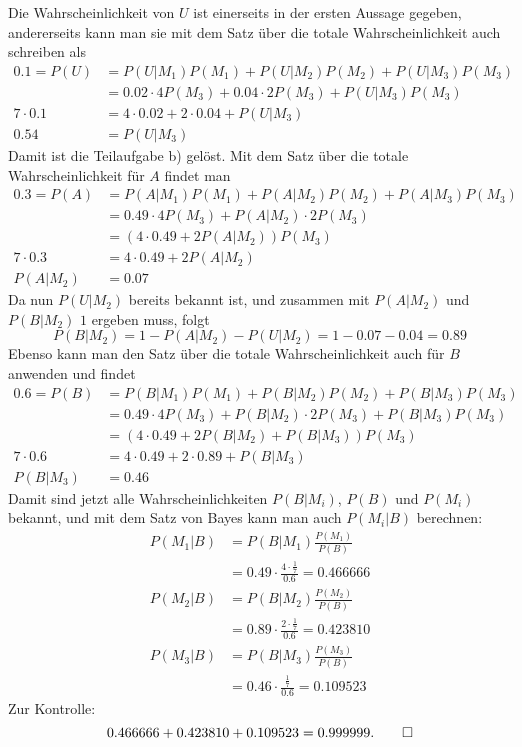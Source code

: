 \begin{loesung}
Die Wahrscheinlichkeit von $U$ ist einerseits in der ersten Aussage
gegeben, andererseits kann man sie mit dem Satz über die totale
Wahrscheinlichkeit auch schreiben als
\begin{align*}
0.1=P(U)
&=P(U|M_1)P(M_1)+P(U|M_2)P(M_2)+P(U|M_3)P(M_3)
\\
&=0.02\cdot 4P(M_3)+0.04\cdot 2P(M_3)+P(U|M_3)P(M_3)
\\
7\cdot 0.1&=4\cdot 0.02+2\cdot 0.04+P(U|M_3)
\\
0.54&=P(U|M_3)
\end{align*}
Damit ist die Teilaufgabe b) gelöst.
Mit dem Satz über die totale Wahrscheinlichkeit für $A$ findet man
\begin{align*}
0.3=P(A)&=
P(A|M_1)P(M_1)
+
P(A|M_2)P(M_2)
+
P(A|M_3)P(M_3)
\\
&=
0.49\cdot 4P(M_3)
+
P(A|M_2)\cdot 2P(M_3)
\\
&=
(4\cdot 0.49
+
2P(A|M_2))P(M_3)
\\
7\cdot 0.3
&=4\cdot 0.49+2P(A|M_2)
\\
P(A|M_2)&=0.07
\end{align*}
Da nun $P(U|M_2)$ bereits bekannt ist, und zusammen mit $P(A|M_2)$
und $P(B|M_2)$ $1$ ergeben muss, folgt
\[
P(B|M_2)=1-P(A|M_2)-P(U|M_2)=1-0.07-0.04=0.89
\]
Ebenso kann man den Satz über die totale Wahrscheinlichkeit auch
für $B$ anwenden und findet
\begin{align*}
0.6=P(B)
&=
P(B|M_1)P(M_1)
+
P(B|M_2)P(M_2)
+
P(B|M_3)P(M_3)
\\
&=
0.49\cdot 4P(M_3)
+
P(B|M_2)\cdot 2P(M_3)
+
P(B|M_3)P(M_3)
\\
&=
(4\cdot 0.49
+
2P(B|M_2)
+
P(B|M_3))P(M_3)
\\
7\cdot 0.6
&=
4\cdot 0.49+2\cdot 0.89 +P(B|M_3)
\\
P(B|M_3)&=0.46
\end{align*}
Damit sind jetzt alle Wahrscheinlichkeiten $P(B|M_i)$, $P(B)$ und
$P(M_i)$ bekannt, und mit dem Satz von Bayes kann man auch $P(M_i|B)$
berechnen:
\begin{align*}
P(M_1|B)&=
P(B|M_1)\frac{P(M_1)}{P(B)}
\\
&=0.49\cdot\frac{4\cdot\frac17}{0.6}
=0.466666
\\
P(M_2|B)&=
P(B|M_2)\frac{P(M_2)}{P(B)}
\\
&=0.89\cdot\frac{2\cdot\frac17}{0.6}
=0.423810
\\
P(M_3|B)&=
P(B|M_3)\frac{P(M_3)}{P(B)}
\\
&=0.46\cdot\frac{\frac17}{0.6}
=0.109523
\end{align*}
Zur Kontrolle:
\[
0.466666+0.423810+0.109523=0.999999.
\qedhere
\]
\end{loesung}

